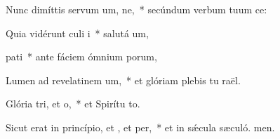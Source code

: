 \item Nunc dimíttis servum um, ne,~* secúndum verbum tuum  ce:
\item Quia vidérunt culi i~* salutá um,
\item {} pati~* ante fáciem ómnium porum,
\item Lumen ad revelatinem um,~* et glóriam plebis tu raël.
\item Glória tri, et o,~* et Spirítu to.
\item Sicut erat in princípio, et , et per,~* et in sǽcula sæculó. men.

